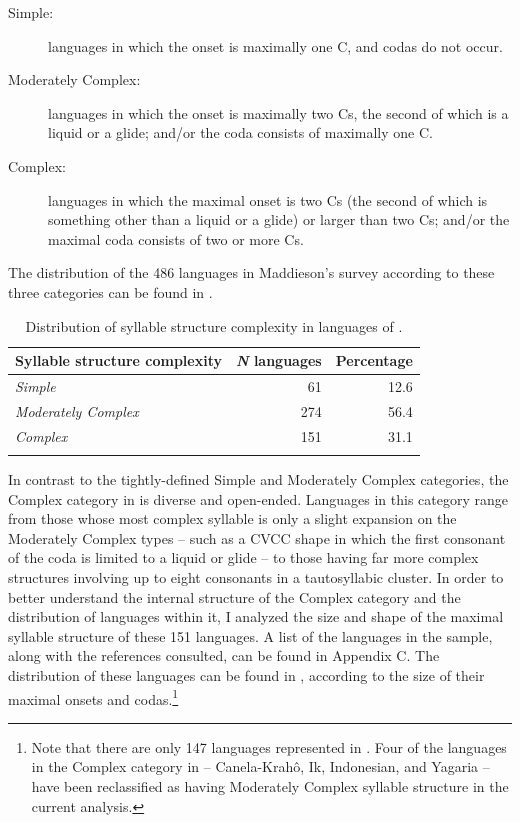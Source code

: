 \begin{description}
\item[Simple:] languages in which the onset is maximally one C, and codas do not occur.
\item[Moderately Complex:] languages in which the onset is maximally two Cs, the second of which is a liquid or a glide; and/or the coda consists of maximally one C.
\item[Complex:] languages in which the maximal onset is two Cs (the second of which is something other than a liquid or a glide) or larger than two Cs; and/or the maximal coda consists of two or more Cs.
\end{description}

The distribution of the 486 languages in Maddieson's survey according to these three categories can be found in .

\begin{table}
\begin{tabular}{lrr}
\lsptoprule
Syllable structure complexity & \textit{N} languages & Percentage\\\midrule
\textit{Simple} & 61 & 12.6\\
\textit{Moderately Complex} & 274 & 56.4\\
\textit{Complex} & 151 & 31.1\\
\lspbottomrule
\end{tabular}
\caption{\label{tab:2.1}Distribution of syllable structure complexity in languages of \citet{Maddieson2013a}.}
\end{table}

  In contrast to the tightly-defined Simple and Moderately Complex categories, the Complex category in \citet{Maddieson2013a} is diverse and open-ended. Languages in this category range from those whose most complex syllable is only a slight expansion on the Moderately Complex types -- such as a CVCC shape in which the first consonant of the coda is limited to a liquid or glide -- to those having far more complex structures involving up to eight consonants in a tautosyllabic cluster. In order to better understand the internal structure of the Complex category and the distribution of languages within it, I analyzed the size and shape of the maximal syllable structure of these 151 languages. A list of the languages in the sample, along with the references consulted, can be found in Appendix C. The distribution of these languages can be found in , according to the size of their maximal onsets and codas.\footnote{{Note that there are only 147 languages represented in . Four of the languages in the Complex category in \citet{Maddieson2013a} -- Canela-Krahô, Ik, Indonesian, and Yagaria -- have been reclassified as having Moderately Complex syllable structure in the current analysis.}}

